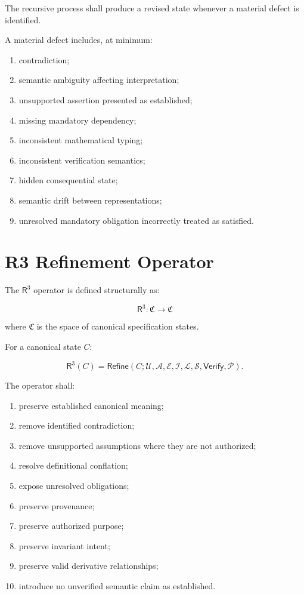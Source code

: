 \documentclass[11pt]{article}
\newcommand{\Rthree}{\ensuremath{\mathsf{R}^{3}}}
\newcommand{\Purpose}{\mathcal{U}}
\newcommand{\Authority}{\mathcal{A}}
\newcommand{\Evidence}{\mathcal{E}}
\newcommand{\Inv}{\mathcal{I}}
\newcommand{\State}{\mathcal{S}}
\newcommand{\Law}{\mathcal{L}}
\newcommand{\Prov}{\mathcal{P}}
\newcommand{\Verify}{\mathsf{Verify}}
\newcommand{\Refine}{\mathsf{Refine}}
\begin{document}
The recursive process shall produce a revised state whenever a
material defect is identified.

A material defect includes, at minimum:

\begin{enumerate}
    \item contradiction;
    \item semantic ambiguity affecting interpretation;
    \item unsupported assertion presented as established;
    \item missing mandatory dependency;
    \item inconsistent mathematical typing;
    \item inconsistent verification semantics;
    \item hidden consequential state;
    \item semantic drift between representations;
    \item unresolved mandatory obligation incorrectly treated as
          satisfied.
\end{enumerate}

\section{R3 Refinement Operator}

The \Rthree{} operator is defined structurally as:

\[
\boxed{
\Rthree:
\mathfrak{C}\rightarrow\mathfrak{C}
}
\]

where $\mathfrak{C}$ is the space of canonical specification
states.

For a canonical state $C$:

\[
\Rthree(C)
=
\Refine
\left(
C;
\Purpose,
\Authority,
\Evidence,
\Inv,
\Law,
\State,
\Verify,
\Prov
\right).
\]

The operator shall:

\begin{enumerate}
    \item preserve established canonical meaning;
    \item remove identified contradiction;
    \item remove unsupported assumptions where they are not
          authorized;
    \item resolve definitional conflation;
    \item expose unresolved obligations;
    \item preserve provenance;
    \item preserve authorized purpose;
    \item preserve invariant intent;
    \item preserve valid derivative relationships;
    \item introduce no unverified semantic claim as established.
\end{enumerate}
\end{document}

